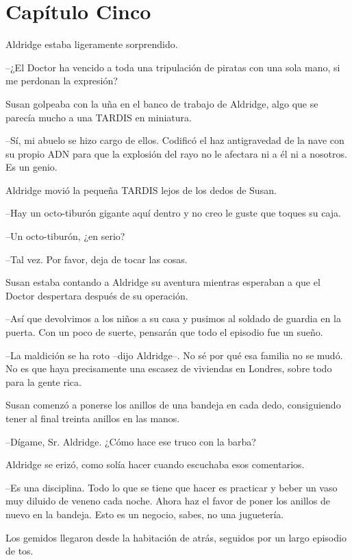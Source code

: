 \chapter*{Capítulo Cinco}

Aldridge estaba ligeramente sorprendido.

--¿El Doctor ha vencido a toda una tripulación de piratas con una sola mano, si me perdonan la expresión?

Susan golpeaba con la uña en el banco de trabajo de Aldridge, algo que se parecía mucho a una TARDIS en miniatura.

--Sí, mi abuelo se hizo cargo de ellos. Codificó el haz antigravedad de la nave con su propio ADN para que la explosión del rayo no le afectara ni a él ni a nosotros. Es un genio.

Aldridge movió la pequeña TARDIS lejos de los dedos de Susan. 

--Hay un octo-tiburón gigante aquí dentro y no creo le guste que toques su caja.

--Un octo-tiburón, ¿en serio?

--Tal vez. Por favor, deja de tocar las cosas.

Susan estaba contando a Aldridge su aventura mientras esperaban a que el Doctor despertara después de su operación.

--Así que devolvimos a los niños a su casa y pusimos al soldado de guardia en la puerta. Con un poco de suerte, pensarán que todo el episodio fue un sueño.

--La maldición se ha roto --dijo Aldridge--. No sé por qué esa familia no se mudó. No es que haya precisamente una escasez de viviendas en Londres, sobre todo para la gente rica.

Susan comenzó a ponerse los anillos de una bandeja en cada dedo, consiguiendo tener al final treinta anillos en las manos. 

--Dígame, Sr. Aldridge. ¿Cómo hace ese truco con la barba?

Aldridge se erizó, como solía hacer cuando escuchaba esos comentarios.

--Es una disciplina. Todo lo que se tiene que hacer es practicar y beber un vaso muy diluido de veneno cada noche. Ahora haz el favor de poner los anillos de nuevo en la bandeja. Esto es un negocio, sabes, no una juguetería.

Los gemidos llegaron desde la habitación de atrás, seguidos por un largo episodio de tos.

